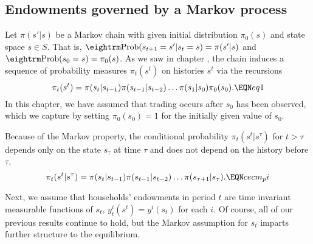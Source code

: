 \subsection{Endowments governed by a Markov process}
Let $\pi(s'|s)$ be a Markov chain with given initial distribution
$\pi_0(s)$ and state space $s\in S$.   That is, ${\rm
Prob}(s_{t+1}  = s' \vert
 s_t = s) =\pi(s'|s)$ and ${\rm Prob}  (s_0 = s) = \pi_0(s)$.
As we saw in chapter ,
 the chain induces a sequence of probability
measures $\pi_t(s^t)$  on histories $s^t$
via the recursions
$$ \pi_t(s^t) = \pi(s_t | s_{t-1}) \pi(s_{t-1} | s_{t-2}) \ldots
       \pi(s_1 | s_0)   \pi_0(s_0) . \EQN eq1  $$
In this chapter, we have assumed that trading occurs after $s_0$ has been observed,
which we capture by setting $\pi_0(s_0)=1$ for the initially
given value of $s_0$.

Because of the Markov property, the conditional probability
$\pi_t(s^t\vert s^\tau)$ for $t>\tau$ depends only on the state
$s_\tau$ at time $\tau$ and does not depend on the history
before $\tau$,
$$\pi_t(s^t|s^\tau) = \pi(s_t\vert s_{t-1}) \pi(s_{t-1} \vert s_{t-2})
          \ldots\pi(s_{\tau+1} \vert s_\tau).\EQN cecm_pi$$


Next, we assume that households' endowments in period $t$ are
time invariant measurable functions of $s_t$,
$y^i_t(s^t)=y^i(s_t)$ for each $i$. %
Of course, all of our
previous results continue to hold, but the Markov assumption
for $s_t$ imparts further structure to the equilibrium.


